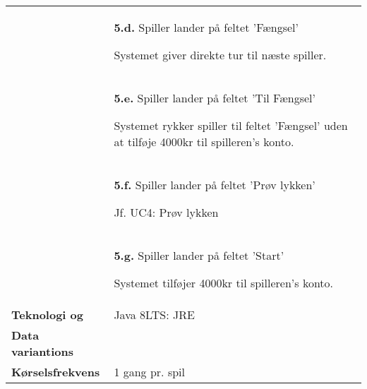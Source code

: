 \documentclass[class=article, crop=false]{standalone}
\begin{document}
\begin{table}[H]
\begin{tabularx}{\textwidth}{|l|X|}
                            & \textbf{5.d.} Spiller lander på feltet 'Fængsel'
                            \begin{enumerate} \begin{tabenum}
                                                  \item Systemet giver direkte tur til næste spiller.
                            \end{tabenum} \end{enumerate}
                            \\


                            & \textbf{5.e.} Spiller lander på feltet 'Til Fængsel'
                            \begin{enumerate} \begin{tabenum}
                                                  \item Systemet rykker spiller til feltet 'Fængsel' uden at tilføje 4000kr til spilleren's konto.
                            \end{tabenum} \end{enumerate}
                            \\



                            & \textbf{5.f.} Spiller lander på feltet 'Prøv lykken'
                            \begin{enumerate} \begin{tabenum}
                                                  \item Jf. UC4: Prøv lykken
                            \end{tabenum} \end{enumerate}
                            \\

                            & \textbf{5.g.} Spiller lander på feltet 'Start'
                            \begin{enumerate} \begin{tabenum}
                                                  \item Systemet tilføjer 4000kr til spilleren's konto.
                            \end{tabenum} \end{enumerate}
                            \\



            \hline








            \textbf{Teknologi og}     & Java 8LTS: JRE \\
            \textbf{Data variantions} &  \\ \hline
            \textbf{Kørselsfrekvens} & 1 gang pr. spil\\ \hline
        \end{tabularx}


    \end{table}
\end{document}
